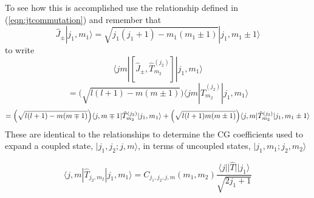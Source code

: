 \documentclass[12pt]{article}
\begin{document}
\noindent To see how this is accomplished use the relationship 
defined in (\ref{eqn:jtcommutation})
and remember that 
\begin{equation}
\hat{J}_{\pm} | j_{1},m_{1}\rangle =
 \sqrt{j_{1}(j_{1}+1) - m_{1}(m_{1}\pm 1 )} | j_{1}, m_{1}\pm1\rangle
\end{equation}
 to write
\begin{equation}
\langle j m | [\hat{J}_{\pm}, \hat{T}^{(j_{2})}_{m_{2}} ] | j_{1}, m_{1}\rangle
\end{equation}
\begin{equation}
= \Big(\sqrt{l(l+1) - m(m\pm1)}\Big)
\langle j m | \hat{T}^{(j_{2})}_{m_{2}} | j_{1}, m_{1}\rangle
\end{equation}
\begin{equation}
= 
\Big(
\sqrt{l(l+1) - m(m\mp1)}
\Big)
\langle j, m\mp 1 |
  \hat{T}^{(j_{2})}_{m_{2}}
 | j_{1}, m_{1}\rangle
+
\Big(
\sqrt{l(l+1)\- m(m\pm 1)}
\Big)
\langle j, m |
  \hat{T}^{(j_{2})}_{m_{2}}
 | j_{1}, m_{1}\pm 1\rangle
\end{equation}
These are identical to the relationships to determine the CG coefficients used to
expand a coupled state, $|j_{1},j_{2};j, m\rangle$, in terms of uncoupled states,
$|j_{1},m_{1};j_{2},m_{2}\rangle$

\begin{equation}
\langle j,m | \hat{T}_{j_{2},m_{2}} | j_{1}, m_{1} \rangle 
 = C_{j_{1}, j_{2}, j,m } (m_{1}, m_{2}) 
 \frac{\langle j || \hat{T} || j_{1} \rangle}
{\sqrt{2j_{1}+1}}
\end{equation}


\end{document}
